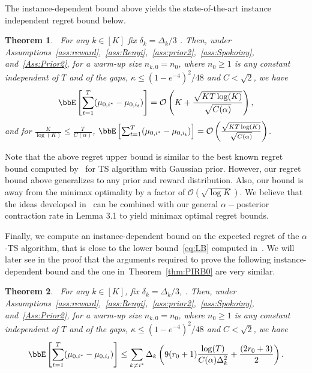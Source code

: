 \documentclass[11pt]{article}
\newtheorem{theorem}{Theorem}
\begin{document}
         The instance-dependent bound above yields the state-of-the-art instance independent regret bound below. 
        \begin{theorem}~\label{thm:PIRB}
            For any $k\in[K]$ fix $\delta_k=\Delta_k/3$ .  Then, under Assumptions~\ref{ass:reward},~\ref{ass:Renyi},~\ref{ass:prior2},~\ref{ass:Spokoiny}, and~\ref{Ass:Prior2},  for a warm-up size $n_{k,0} = n_0$, where $n_0 \geq 1$ is any constant independent of $T$ and of the gaps, $\kappa \leq (1-e^{-4})^2/48$ and $C < \sqrt{2}$, we have
        \begin{align}
            \bbE  \left[ \sum_{t=1}^{T} (\mu_{0,i^*} -  \mu_{0,i_t})  \right] = \mathcal{O}\left(K+\frac{\sqrt{KT\log(K)}}{\sqrt{C(\alpha)}} \right) ,
        \end{align}
        and for $\frac{K}{\log(K)}\leq \frac{T}{C(\alpha)}$, $\bbE  \left[ \sum_{t=1}^{T} (\mu_{0,i^*} -  \mu_{0,i_t})  \right] = \mathcal{O}\left(\frac{\sqrt{KT\log(K)}}{\sqrt{C(\alpha)}} \right) $.
        \end{theorem}
Note that the above regret upper bound is similar to the best known regret bound computed by~\cite{agrawal2013further} for TS algorithm with Gaussian prior. However, our regret bound above generalizes to any prior and reward distribution. Also, our bound is away from the minimax optimality by a factor of $\mathcal{O}(\sqrt{\log K})$. We believe that the ideas developed in~\cite{jin21d} can be combined
with our general $\alpha-$posterior contraction rate in Lemma 3.1 to yield minimax optimal regret bounds. %

Finally, we compute an instance-dependent bound on the expected regret of the $\alpha$-TS algorithm, that is close to the lower bound~\eqref{eq:LB} computed in~\cite{lai1985asymptotically,burnetas1996optimal}. We will later see in the proof that the arguments required to prove the following instance-dependent bound and the one in~Theorem~\ref{thm:PIRB0} are very similar.
\begin{theorem}~\label{thm:RB-PD}
    For any $k\in[K]$, fix $\delta_k=\Delta_k/3$, .  Then, under Assumptions~\ref{ass:reward},~\ref{ass:Renyi},~\ref{ass:prior2},~\ref{ass:Spokoiny}, and~\ref{Ass:Prior2},  for a warm-up size $n_{k,0} = n_0$, where $n_0 \geq 1$ is any constant independent of $T$ and of the gaps, $\kappa \leq (1-e^{-4})^2/48$ and $C < \sqrt{2}$, we have
        \begin{align}
            \bbE  \left[ \sum_{t=1}^{T} (\mu_{0,i^*} -  \mu_{0,i_t})  \right] \leq \sum_{k \neq i^*} \Delta_k\left(9(r_0+1) \frac{\log(T)}{C(\alpha)\Delta_k^2}  + \frac{(2r_0+3)}{2} \right).
        \end{align}
\end{theorem}
\end{document}
